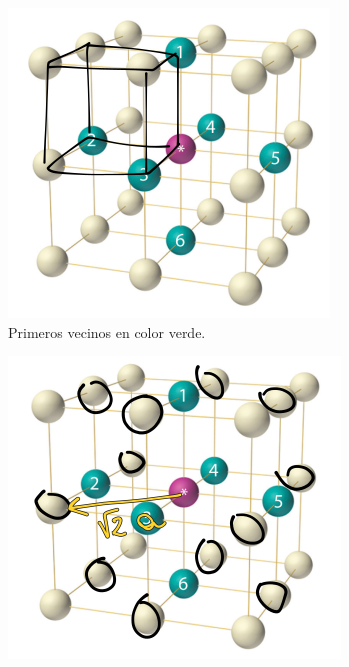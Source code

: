 \documentclass[a4paper]{article}
\begin{document}
\begin{figure}[H]
  \centering
  \begin{subfigure}[b]{0.4\linewidth}
    \includegraphics[width=\linewidth]{red3d_sc0.png}
     \caption{Primeros vecinos en color verde.}
  \end{subfigure}
  \begin{subfigure}[b]{0.4\linewidth}
    \includegraphics[width=\linewidth]{red3d_sc1.png}

\end{subfigure}
\end{figure}
\end{document}
